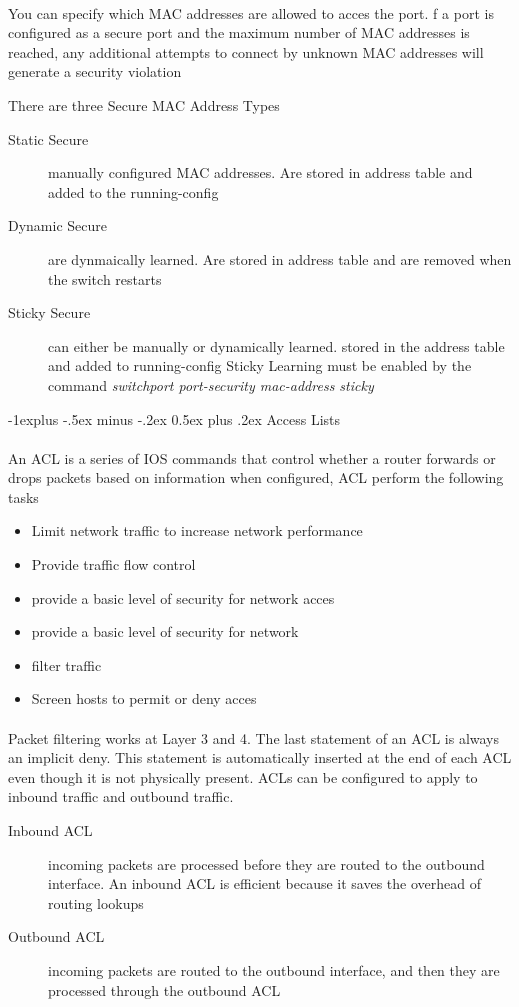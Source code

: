 \documentclass[10pt,landscape]{article}
\makeatletter
\renewcommand{\subsection}{\@startsection{subsection}{2}{0mm}%
                                {-1explus -.5ex minus -.2ex}%
                                {0.5ex plus .2ex}%
                                {\normalfont\normalsize\bfseries}}
\makeatother
\begin{document}
\begin{multicols}{3}
\paragraph{}
You can specify which MAC addresses are allowed to acces the port. f a port is configured as a secure port and the maximum number of MAC addresses is reached, any additional attempts to connect by unknown MAC addresses will generate a security violation

There are three Secure MAC Address Types
\begin{description}
	\item[Static Secure ] manually configured MAC addresses. Are stored in address table and added to the running-config
	\item[Dynamic Secure] are dynmaically learned. Are stored in address table and are removed when the switch restarts
	\item[Sticky Secure] can either be manually or dynamically learned. stored in the address table and added to running-config Sticky Learning must be enabled by the command \textit{switchport port-security mac-address sticky}
\end{description}

\subsection{Access Lists}
\paragraph{}
An ACL is a series of IOS commands that control whether a router forwards or drops packets based on information
when configured, ACL perform the following tasks
\begin{itemize}
	\item Limit network traffic to increase network performance
	\item Provide traffic flow control
	\item provide a basic level of security for network acces
	\item provide a basic level of security for network
	\item filter traffic
	\item Screen hosts to permit or deny acces
\end{itemize}
\paragraph{}
Packet filtering works at Layer 3 and 4. The last statement of an ACL is always an implicit deny. This statement is automatically inserted at the end of each ACL even though it is not physically present. ACLs can be configured to apply to inbound traffic and outbound traffic.
\begin{description}
	\item[Inbound ACL] incoming packets are processed before they are routed to the outbound interface. An inbound ACL is efficient because it saves the overhead of routing lookups
	\item[Outbound ACL] incoming packets are routed to the outbound interface, and then they are processed through the outbound ACL
\end{description}

\end{multicols}
\end{document}
